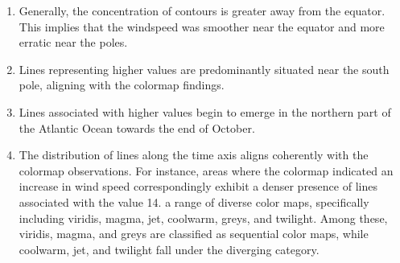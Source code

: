\documentclass[conference]{IEEEtran}
\begin{document}
\begin{enumerate}

    
    
    \item Generally, the concentration of contours is greater away from the equator. This implies that the windspeed was smoother near the equator and more erratic near the poles.

    \item Lines representing higher values are predominantly situated near the south pole, aligning with the colormap findings.
    
    \item Lines associated with higher values begin to emerge in the northern part of the Atlantic Ocean towards the end of October.
    
    \item The distribution of lines along the time axis aligns coherently with the colormap observations. For instance, areas where the colormap indicated an increase in wind speed correspondingly exhibit a denser presence of lines associated with the value 14. a range of diverse color maps, specifically including viridis, magma, jet, coolwarm, greys, and twilight. Among these, viridis, magma, and greys are classified as sequential color maps, while coolwarm, jet, and twilight fall under the diverging category.

\end{enumerate}
\end{document}
